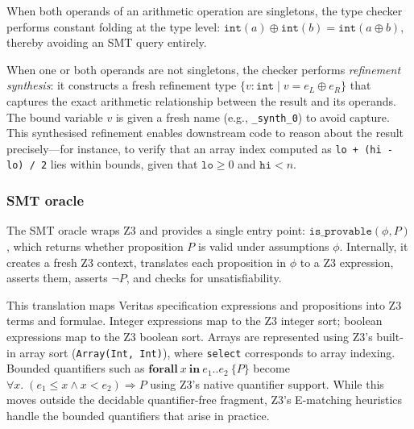 When both operands of an arithmetic operation are singletons, the type checker performs constant folding at the type level: $\mathtt{int}(a) \oplus \mathtt{int}(b) = \mathtt{int}(a \oplus b)$, thereby avoiding an SMT query entirely.

When one or both operands are not singletons, the checker performs \textit{refinement synthesis}: it constructs a fresh refinement type $\{v\!:\!\mathtt{int} \mid v = e_L \oplus e_R\}$ that captures the exact arithmetic relationship between the result and its operands. The bound variable $v$ is given a fresh name (e.g., \texttt{\_synth\_0}) to avoid capture. This synthesised refinement enables downstream code to reason about the result precisely---for instance, to verify that an array index computed as \texttt{lo + (hi - lo) / 2} lies within bounds, given that $\mathtt{lo} \ge 0$ and $\mathtt{hi} < n$.

%

\subsubsection{SMT oracle}\label{sec:smt-oracle}

The SMT oracle wraps Z3 and provides a single entry point: $\texttt{is\_provable}(\phi, P)$, which returns whether proposition $P$ is valid under assumptions $\phi$. Internally, it creates a fresh Z3 context, translates each proposition in $\phi$ to a Z3 expression, asserts them, asserts $\lnot P$, and checks for unsatisfiability.

This translation maps Veritas specification expressions and propositions into Z3 terms and formulae. Integer expressions map to the Z3 integer sort; boolean expressions map to the Z3 boolean sort. Arrays are represented using Z3's built-in array sort (\texttt{Array(Int, Int)}), where \texttt{select} corresponds to array indexing. Bounded quantifiers such as $\mathbf{forall}\ x\ \mathbf{in}\ e_1..e_2\ \{P\}$ become $\forall x.\; (e_1 \le x \wedge x < e_2) \Rightarrow P$ using Z3's native quantifier support. While this moves outside the decidable quantifier-free fragment, Z3's E-matching heuristics handle the bounded quantifiers that arise in practice.

